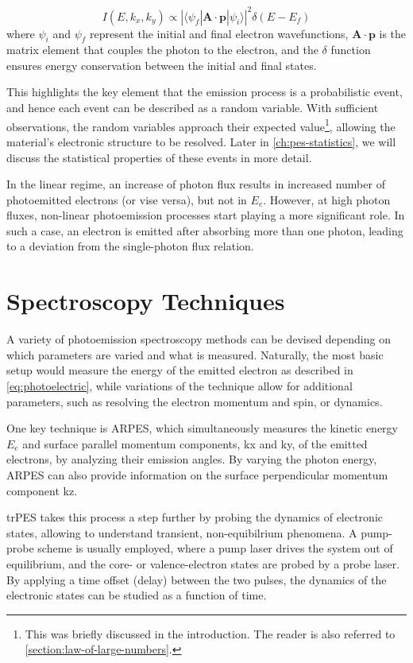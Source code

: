 \begin{equation}
    I(E, k_x, k_y) \propto |\langle \psi_f | \mathbf{A} \cdot \mathbf{p} | \psi_i \rangle|^2 \delta(E - E_f)
\end{equation}
where $\psi_i$ and $\psi_f$ represent the initial and final electron wavefunctions, $\mathbf{A} \cdot \mathbf{p}$ is the matrix element that couples the photon to the electron, and the $\delta$ function ensures energy conservation between the initial and final states.

This highlights the key element that the emission process is a probabilistic event, and hence each event can be described as a random variable. With sufficient observations, the random variables approach their expected value\footnote{This was briefly discussed in the introduction. The reader is also referred to \cref{section:law-of-large-numbers}.}, allowing the material's electronic structure to be resolved. Later in \cref{ch:pes-statistics}, we will discuss the statistical properties of these events in more detail.

In the linear regime, an increase of photon flux results in increased number of photoemitted electrons (or vise versa), but not in $E_e$. However, at high photon fluxes, non-linear photoemission processes start playing a more significant role. In such a case, an electron is emitted after absorbing more than one photon, leading to a deviation from the single-photon flux relation. 

\section{Spectroscopy Techniques}\label{section:spectroscopy-techniques}
A variety of photoemission spectroscopy methods can be devised depending on which parameters are varied and what is measured. Naturally, the most basic setup would measure the energy of the emitted electron as described in \cref{eq:photoelectric}, while variations of the technique allow for additional parameters, such as resolving the electron momentum and spin, or dynamics.

One key technique is \gls{ARPES}, which simultaneously measures the kinetic energy $E_e$ and surface parallel momentum components, \gls{kx} and \gls{ky}, of the emitted electrons, by analyzing their emission angles. By varying the photon energy, \gls{ARPES} can also provide information on the surface perpendicular momentum component \gls{kz}. 

\gls{trPES} takes this process a step further by probing the dynamics of electronic states, allowing to understand transient, non-equibilrium phenomena. A pump-probe scheme is usually employed, where a pump laser drives the system out of equilibrium, and the core- or valence-electron states are probed by a probe laser. By applying a time offset (delay) between the two pulses, the dynamics of the electronic states can be studied as a function of time.

